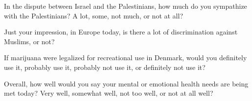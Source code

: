 \documentclass[a4, 12pt]{article}
\begin{document}
\begin{itemize*}
	\item In the dispute between Israel and the Palestinians, how much do you sympathize with the Palestinians? A lot, some, not much, or not at all?
	\item Just your impression, in Europe today, is there a lot of discrimination against Muslims, or not?
	\item If marijuana were legalized for recreational use in Denmark, would you definitely use it, probably use it, probably not use it, or definitely not use it?
	\item Overall, how well would you say your mental or emotional health needs are being met today? Very well, somewhat well, not too well, or not at all well?
\end{itemize*}
\end{document}
